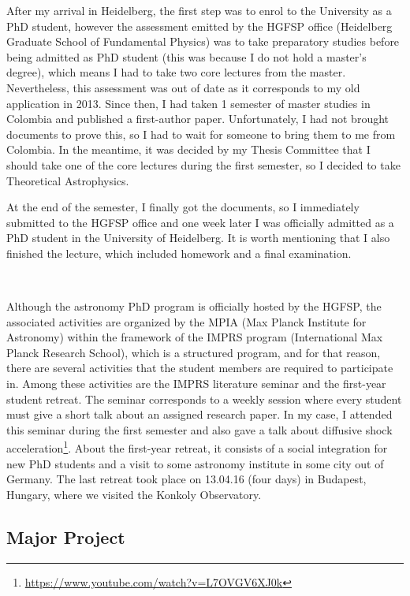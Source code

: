\documentclass[a4,useAMS,usenatbib,usegraphicx,12pt]{article}
\begin{document}
After my arrival in Heidelberg, the first step was to enrol to the University as
a PhD student, however the assessment emitted by the HGFSP office (Heidelberg 
Graduate School of Fundamental Physics) was to take preparatory studies before 
being admitted as PhD student (this was because I do not hold a master's degree), 
which means I had to take two core lectures from the master. Nevertheless, this 
assessment was out of date as it corresponds to my old application in 2013. Since 
then, I had taken 1 semester of master studies in Colombia and published a 
first-author paper. Unfortunately, I had not brought documents to prove this, so
I had to wait for someone to bring them to me from Colombia. In the meantime,
it was decided by my Thesis Committee that I should take one of the core lectures 
during the first semester, so I decided to take Theoretical Astrophysics.

At the end of the semester, I finally got the documents, so I immediately 
submitted to the HGFSP office and one week later I was officially admitted as a
PhD student in the University of Heidelberg. It is worth mentioning that I also
finished the lecture, which included homework and a final examination.

\

Although the astronomy PhD program is officially hosted by the HGFSP, the 
associated activities are organized by the MPIA (Max Planck Institute for 
Astronomy) within the framework of the IMPRS program (International Max Planck
Research School), which is a structured program, and for that reason, there are 
several activities that the student members are required to participate in. 
Among these activities are the IMPRS literature seminar and the first-year 
student retreat. The seminar corresponds to a weekly session where every student 
must give a short talk about an assigned research paper. In my case, I attended 
this seminar during the first semester and also gave a talk about diffusive 
shock acceleration\footnote{\url{https://www.youtube.com/watch?v=L7OVGV6XJ0k}}.
About the first-year retreat, it consists of a social integration for new PhD
students and a visit to some astronomy institute in some city out of Germany.
The last retreat took place on 13.04.16 (four days) in Budapest, Hungary, where
we visited the Konkoly Observatory.


\subsection{Major Project}
\end{document}
